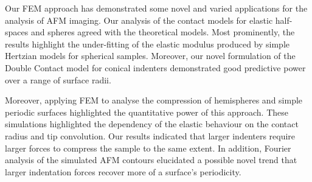 Our FEM approach has demonstrated some novel and varied applications for the analysis of AFM imaging. Our analysis of the contact models for elastic half-spaces and spheres agreed with the theoretical models. Most prominently, the results highlight the under-fitting of the elastic modulus produced by simple Hertzian models for spherical samples. Moreover, our novel formulation of the Double Contact model for conical indenters demonstrated good predictive power over a range of surface radii.  

 Moreover, applying FEM to analyse the compression of hemispheres and simple periodic surfaces highlighted the quantitative power of this approach. These simulations highlighted the dependency of the elastic behaviour on the contact radius and tip convolution. Our results indicated that larger indenters require larger forces to compress the sample to the same extent. In addition, Fourier analysis of the simulated AFM contours elucidated a possible novel trend that larger indentation forces recover more of a surface's periodicity. 
